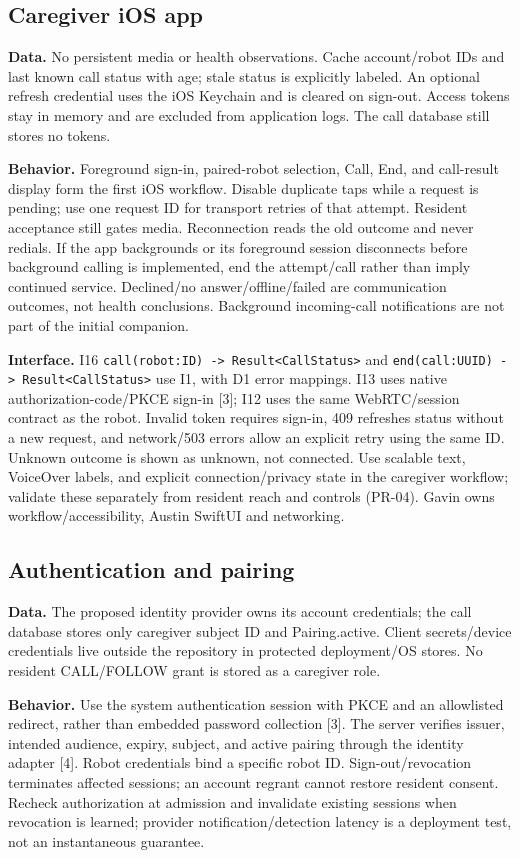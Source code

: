 \documentclass[12pt,letterpaper]{article}
\newcommand{\field}[1]{\texttt{#1}}
\begin{document}
\subsection*{Caregiver iOS app}
\textbf{Data.} No persistent media or health observations. Cache account/robot IDs and last known call status with age; stale status is explicitly labeled. An optional refresh credential uses the iOS Keychain and is cleared on sign-out. Access tokens stay in memory and are excluded from application logs. The call database still stores no tokens.

\textbf{Behavior.} Foreground sign-in, paired-robot selection, Call, End, and call-result display form the first iOS workflow. Disable duplicate taps while a request is pending; use one request ID for transport retries of that attempt. Resident acceptance still gates media. Reconnection reads the old outcome and never redials. If the app backgrounds or its foreground session disconnects before background calling is implemented, end the attempt/call rather than imply continued service. Declined/no answer/offline/failed are communication outcomes, not health conclusions. Background incoming-call notifications are not part of the initial companion.

\textbf{Interface.} I16 \field{call(robot:ID) -> Result<CallStatus>} and \field{end(call:UUID) -> Result<CallStatus>} use I1, with D1 error mappings. I13 uses native authorization-code/PKCE sign-in [3]; I12 uses the same WebRTC/session contract as the robot. Invalid token requires sign-in, 409 refreshes status without a new request, and network/503 errors allow an explicit retry using the same ID. Unknown outcome is shown as unknown, not connected. Use scalable text, VoiceOver labels, and explicit connection/privacy state in the caregiver workflow; validate these separately from resident reach and controls (PR-04). Gavin owns workflow/accessibility, Austin SwiftUI and networking.

\subsection*{Authentication and pairing}
\textbf{Data.} The proposed identity provider owns its account credentials; the call database stores only caregiver subject ID and Pairing.active. Client secrets/device credentials live outside the repository in protected deployment/OS stores. No resident CALL/FOLLOW grant is stored as a caregiver role.

\textbf{Behavior.} Use the system authentication session with PKCE and an allowlisted redirect, rather than embedded password collection [3]. The server verifies issuer, intended audience, expiry, subject, and active pairing through the identity adapter [4]. Robot credentials bind a specific robot ID. Sign-out/revocation terminates affected sessions; an account regrant cannot restore resident consent. Recheck authorization at admission and invalidate existing sessions when revocation is learned; provider notification/detection latency is a deployment test, not an instantaneous guarantee.
\end{document}
